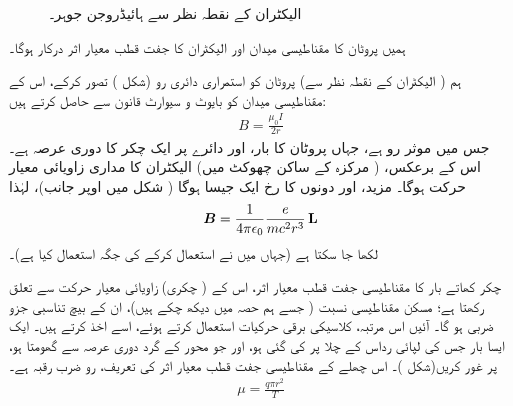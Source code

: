 \begin{figure}
\centering
{}
\caption{الیکٹران کے نقطہ نظر سے ہائیڈروجن جوہر۔}
\label{شکل_غیر_تابع_اضطراب_جوہر_الیکٹران_نقطہ_نظر}
\end{figure}

ہمیں پروٹان کا مقناطیسی میدان  اور الیکٹران کا جفت قطب معیار اثر  درکار ہوگا۔ 

\quad
{} ہم ( الیکٹران کے نقطہ نظر سے) پروٹان کو استمراری دائری رو (شکل ) تصور کرکے، اس کے مقناطیسی میدان کو بایوٹ و سيوارٹ قانون سے حاصل کرتے ہیں:
\begin{align*} 
B = \frac{\mu_0 I}{2r}
\end{align*}
جس میں موثر رو  ہے، جہاں  پروٹان کا بار، اور  دائرے پر ایک چکر کا دوری عرصہ ہے۔ اس کے برعکس،  ( مرکزہ کے ساکن چھوکٹ میں) الیکٹران کا مداری زاویائی معیار حرکت ہوگا۔ مزید،  اور  دونوں کا رخ ایک جیسا ہوگا ( شکل  میں اوپر جانب)، لہٰذا
\begin{align}\label{مساوات_غیر_مضطرب_اندرونی_مقناطیسی_میدان}
{\ensuremath{{\boldsymbol{B}}}} = \frac{1}{4 \pi \epsilon_0} \frac{e}{mc^2 r^3} \operatorname{\mathbf{L}}
\end{align}
لکھا جا سکتا ہے (جہاں میں نے  استعمال کرکے  کی جگہ  استعمال کیا ہے)۔ 

\quad
{} چکر کھاتے بار کا مقناطیسی جفت قطب معیار اثر، اس کے ( چکری) زاویائی معیار حرکت سے تعلق رکھتا ہے؛ مسکن مقناطیسی نسبت ( جسے ہم حصہ  میں دیکھ چکے ہیں)، ان کے بیچ تناسبی جزو ضربی ہو گا۔ آئیں اس مرتبہ، کلاسیکی برقی حرکیات استعمال کرتے ہوئے، اسے اخذ کرتے ہیں۔ ایک ایسا بار  جس کی لپائی رداس  کے چلا پر کی گئی ہو، اور جو محور کے گرد دوری عرصہ  سے گھومتا ہو، پر غور کریں(شکل )۔ اس چھلے کے مقناطیسی جفت قطب معیار اثر کی تعریف، رو  ضرب رقبہ  ہے۔
\begin{align*}
\mu = \frac{q \pi r^2}{T}
\end{align*}

